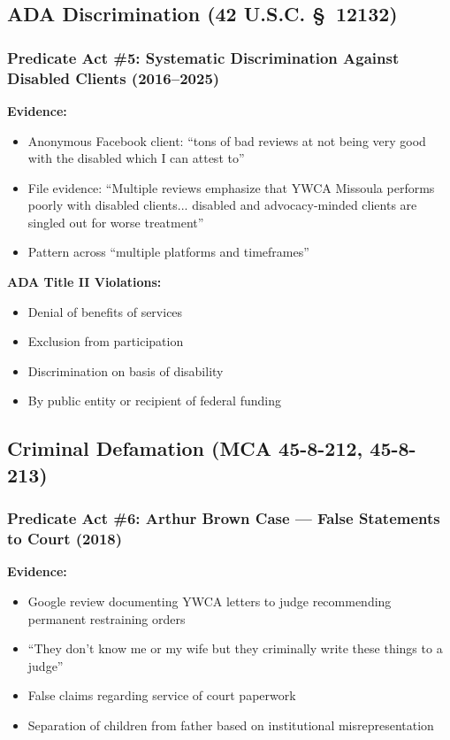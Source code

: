 \documentclass[11pt,letterpaper]{article}
\begin{document}
\subsection{ADA Discrimination (42 U.S.C. \S~12132)}

\subsubsection{Predicate Act \#5: Systematic Discrimination Against Disabled Clients (2016--2025)}

\textbf{Evidence:}
\begin{itemize}[leftmargin=*]
\item Anonymous Facebook client: ``tons of bad reviews at not being very good with the disabled which I can attest to''
\item File evidence: ``Multiple reviews emphasize that YWCA Missoula performs poorly with disabled clients... disabled and advocacy-minded clients are singled out for worse treatment''
\item Pattern across ``multiple platforms and timeframes''
\end{itemize}

\textbf{ADA Title II Violations:}
\begin{itemize}[leftmargin=*]
\item Denial of benefits of services
\item Exclusion from participation
\item Discrimination on basis of disability
\item By public entity or recipient of federal funding
\end{itemize}

\subsection{Criminal Defamation (MCA 45-8-212, 45-8-213)}

\subsubsection{Predicate Act \#6: Arthur Brown Case --- False Statements to Court (2018)}

\textbf{Evidence:}
\begin{itemize}[leftmargin=*]
\item Google review documenting YWCA letters to judge recommending permanent restraining orders
\item ``They don't know me or my wife but they criminally write these things to a judge''
\item False claims regarding service of court paperwork
\item Separation of children from father based on institutional misrepresentation
\end{itemize}
\end{document}
